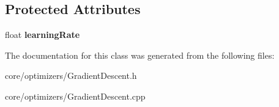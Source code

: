 \subsection*{Protected Attributes}
\begin{DoxyCompactItemize}
\item 
\mbox{\label{classathena_1_1core_1_1optimizers_1_1_gradient_descent_a40fd65d38f6804e2e8c7109f7cd27e67}} 
float {\bfseries learning\+Rate}
\end{DoxyCompactItemize}


The documentation for this class was generated from the following files\+:\begin{DoxyCompactItemize}
\item 
core/optimizers/Gradient\+Descent.\+h\item 
core/optimizers/Gradient\+Descent.\+cpp\end{DoxyCompactItemize}
